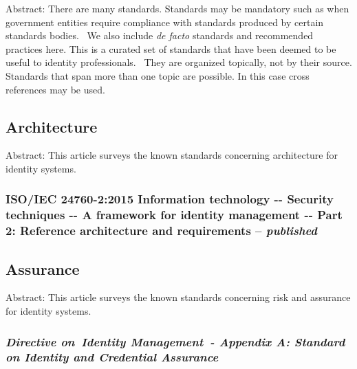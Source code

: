 Abstract: There are many standards. Standards may be mandatory such as
when government entities require compliance with standards produced by
certain standards bodies.~ We also include \emph{de facto} standards and
recommended practices here. This is a curated set of standards that have
been deemed to be useful to identity professionals.~ They are organized
topically, not by their source. Standards that span more than one topic
are possible. In this case cross references may be used.

\hypertarget{architecture}{%
\subsection{Architecture}\label{architecture}}

Abstract: This article surveys the known standards concerning
architecture for identity systems.

\hypertarget{isoiec-24760-22015-information-technology----security-techniques----a-framework-for-identity-management----part-2-reference-architecture-and-requirements-published}{%
\subsubsection{\texorpdfstring{ISO/IEC 24760-2:2015 Information technology
-\/- Security techniques -\/- A framework for identity management -\/-
Part 2: Reference architecture and requirements --
\emph{published}}{ISO/IEC 24760-2:2015 Information technology -\/- Security techniques -\/- A framework for identity management -\/- Part 2: Reference architecture and requirements -- published}}\label{isoiec-24760-22015-information-technology----security-techniques----a-framework-for-identity-management----part-2-reference-architecture-and-requirements-published}}

\hypertarget{assurance}{%
\subsection{Assurance}\label{assurance}}

Abstract: This article surveys the known standards concerning risk and
assurance for identity systems.

\hypertarget{directive-on-identity-management---appendix-a-standard-on-identity-and-credential-assurance}{%
\subsubsection{\texorpdfstring{\emph{Directive on~Identity Management~-
Appendix A: Standard on Identity and Credential
Assurance}}{Directive on~Identity Management~- Appendix A: Standard on Identity and Credential Assurance}}\label{directive-on-identity-management---appendix-a-standard-on-identity-and-credential-assurance}}

